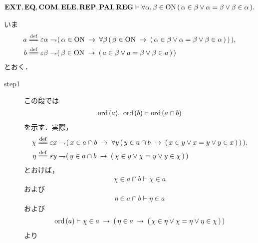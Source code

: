 	\begin{screen}
		\begin{thm}
		\label{thm:ON_is_totally_ordered}
			\begin{align}
				\mbox{{\bf EXT}},\mbox{{\bf EQ}},\mbox{\bf COM},\mbox{{\bf ELE}},\mbox{{\bf REP}},\mbox{{\bf PAI}},\mbox{{\bf REG}} \vdash 
				\forall \alpha,\beta \in \mathrm{ON}\,
				(\, \alpha \in \beta \vee \alpha = \beta \vee \beta \in \alpha\, ).
			\end{align}
		\end{thm}
	\end{screen}
	
	\begin{sketch}
		いま
		\begin{align}
			a &\defeq \varepsilon \alpha \negation 
			(\, \alpha \in \ON \rarrow \forall \beta\, (\, \beta \in \ON \rarrow 
			(\, \alpha \in \beta \vee \alpha = \beta \vee \beta \in \alpha\, )\,) \,), \\
			b &\defeq \varepsilon \beta \negation (\, \beta \in \ON \rarrow 
			(\, a \in \beta \vee a = \beta \vee \beta \in a\, )\,)
		\end{align}
		とおく．
		\begin{description}
			\item[step1] この段では
				\begin{align}
					\operatorname*{ord}\hspace{0.15em}(a),\ \operatorname*{ord}\hspace{0.15em}(b) \vdash \operatorname*{ord}\hspace{0.15em}(a \cap b)
					\label{fom:ON_is_totally_ordered_1}
				\end{align}
				を示す．実際，
				\begin{align}
					\chi &\defeq \varepsilon x \negation 
					(\, x \in a \cap b \rarrow \forall y\, (\, 
					y \in a \cap b \rarrow (\, x \in y \vee x = y \vee y \in x\, )\, )\, ), \\
					\eta &\defeq \varepsilon y \negation (\, 
					y \in a \cap b \rarrow (\, \chi \in y \vee \chi = y \vee y \in \chi\, )\, )
				\end{align}
				とおけば，
				\begin{align}
					\chi \in a \cap b \vdash \chi \in a
				\end{align}
				および
				\begin{align}
					\eta \in a \cap b \vdash \eta \in a
				\end{align}
				および
				\begin{align}
					\operatorname*{ord}\hspace{0.15em}(a) \vdash \chi \in a \hspace{0.25em}\rightarrow\hspace{0.25em} (\, 
					\eta \in a \hspace{0.25em}\rightarrow\hspace{0.25em} (\, \chi \in \eta \vee \chi = \eta \vee \eta \in \chi\, )\, )
				\end{align}
				より
				\begin{align}

\end{align}
\end{description}
\end{sketch}
